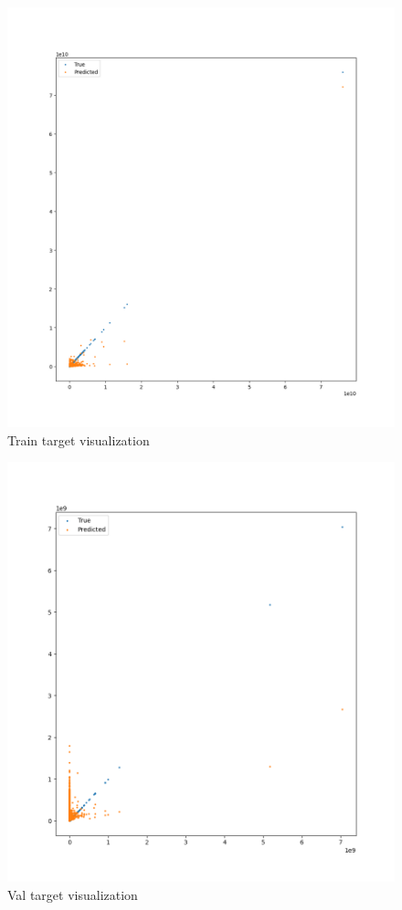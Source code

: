 \documentclass[a4paper, 12pt, one column]{article}
\begin{document}
\begin{figure}[H]
\centering
\includegraphics[scale=0.5]{train_target.png}
\caption{Train target visualization}
\label{fig:train_target}
\end{figure}

\begin{figure}[H]
\centering
\includegraphics[scale=0.5]{val_target.png}
\caption{Val target visualization}
\label{fig:val_target}
\end{figure}
\end{document}
